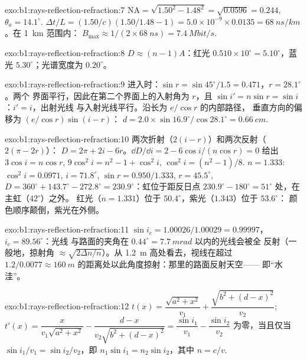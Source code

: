 \begin{solution}{exo:b1:rays-reflection-refraction:7}
$\mathrm{NA} = \sqrt{1.50^2 - 1.48^2} = \sqrt{0.0596} = 0.244$,
$\theta_a = 14.1^\circ$. $\Delta t/L = (1.50/c)(1.50/1.48 - 1) =
5.0\times10^{-9} \times 0.0135 = \qty{68}{ns/km}$。在 \qty{1}{km} 范围内：
$B_{\max} \approx 1/(2 \times \qty{68}{ns}) = \qty{7.4}{Mbit/s}$.
\end{solution}

\begin{solution}{exo:b1:rays-reflection-refraction:8}
$D \approx (n - 1)A$：红光 $0.510 \times 10^\circ = 5.10^\circ$，蓝光
$5.30^\circ$；光谱宽度为 $0.20^\circ$。
\end{solution}

\begin{solution}{exo:b1:rays-reflection-refraction:9}
进入时：$\sin r = \sin 45^\circ/1.5 = 0.471$，$r = 28.1^\circ$。两个
界面平行，因此在第二个界面上的入射角为 $r$，且
$\sin i' = n\sin r = \sin i$：$i' = i$，出射光线
与入射光线平行。沿长为 $e/\cos r$ 的内部路径，
垂直方向的偏移为 $(e/\cos r)\sin(i - r)$：
$d = 2.0 \times \sin 16.9^\circ/\cos 28.1^\circ = \qty{0.66}{cm}$.
\end{solution}

\begin{solution}{exo:b1:rays-reflection-refraction:10}
两次折射（$2(i - r)$）和两次反射（$2(\pi - 2r)$）：
$D = 2\pi + 2i - 6r$。$\dd D/\dd i = 2 - 6\cos i/(n\cos r) = 0$ 给出
$3\cos i = n\cos r$, $9\cos^2 i = n^2 - 1 + \cos^2 i$, $\cos^2 i =
(n^2 - 1)/8$. $n = 1.333$: $\cos^2 i = 0.0971$, $i = 71.8^\circ$,
$\sin r = 0.950/1.333$, $r = 45.5^\circ$, $D = 360^\circ + 143.7^\circ -
272.8^\circ = 230.9^\circ$：虹位于距反日点 $230.9^\circ - 180^\circ =
51^\circ$ 处，在主虹（$42^\circ$）之外。
红光（$n = 1.331$）位于 $50.4^\circ$，紫光（$1.343$）位于 $53.6^\circ$：
颜色顺序颠倒，紫光在外侧。
\end{solution}

\begin{solution}{exo:b1:rays-reflection-refraction:11}
$\sin i_c = 1.00026/1.00029 = 0.99997$，$i_c = 89.56^\circ$：光线
与路面的夹角在 $0.44^\circ = \qty{7.7}{mrad}$ 以内的光线会被全
反射（一般地，掠射角 $\approx \sqrt{2\Delta n/n}$）。从
\qty{1.2}{m} 高处看去，视线在超过
$1.2/0.0077 \approx \qty{160}{m}$ 的距离处以此角度掠射：那里的路面反射天空——
即“水洼”。
\end{solution}

\begin{solution}{exo:b1:rays-reflection-refraction:12}
$t(x) = \dfrac{\sqrt{a^2 + x^2}}{v_1} + \dfrac{\sqrt{b^2 + (d - x)^2}}{v_2}$;
$t'(x) = \dfrac{x}{v_1\sqrt{a^2 + x^2}} - \dfrac{d - x}{v_2\sqrt{b^2 + (d - x)^2}}
= \dfrac{\sin i_1}{v_1} - \dfrac{\sin i_2}{v_2}$ 为零，当且仅当
$\sin i_1/v_1 = \sin i_2/v_2$，即 $n_1\sin i_1 = n_2\sin i_2$，其中
$n = c/v$.
\end{solution}

